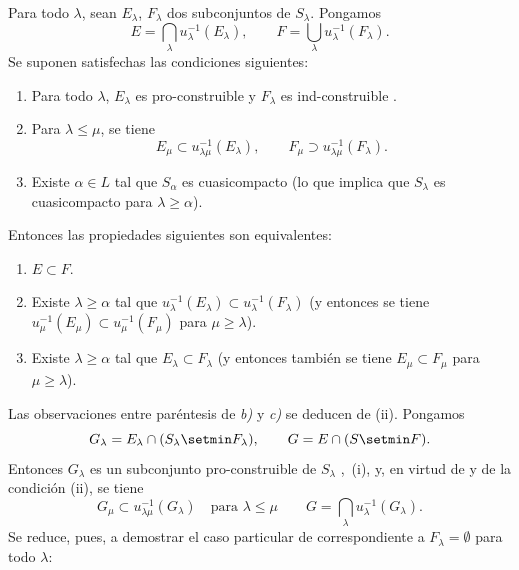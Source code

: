 \begin{theorem}[8.3.2]
\label{IV.8.3.2-fr}
Para todo $\lambda$, sean $E_\lambda$, $F_\lambda$ dos subconjuntos de $S_\lambda$.
Pongamos
\begin{equation}
E=\bigcap_\lambda u_\lambda^{-1}(E_\lambda),\qquad
F=\bigcup_\lambda u_\lambda^{-1}(F_\lambda).
\tag{8.3.2.1}\label{IV.8.3.2.1-fr}
\end{equation}
Se suponen satisfechas las condiciones siguientes:
\begin{enumerate}[label=\textup{(\roman*)}]
   \item Para todo $\lambda$, $E_\lambda$ es pro-construible y $F_\lambda$ es ind-construible .
   \item Para $\lambda\leq\mu$, se tiene
  \[
E_\mu\subset u_{\lambda\mu}^{-1}(E_\lambda),\qquad
F_\mu\supset u_{\lambda\mu}^{-1}(F_\lambda).
\]
   \item Existe $\alpha\in L$ tal que $S_\alpha$ es cuasicompacto \textup{(lo que implica que $S_\lambda$ es cuasicompacto para $\lambda\geq\alpha$)}.
\end{enumerate}
Entonces las propiedades siguientes son equivalentes:
\begin{enumerate}[label=\emph{\alph*)}]
   \item $E\subset F$.
   \item Existe $\lambda\geq\alpha$ tal que $u_\lambda^{-1}(E_\lambda)\subset u_\lambda^{-1}(F_\lambda)$ \textup{(y entonces se tiene $u_\mu^{-1}(E_\mu)\subset u_\mu^{-1}(F_\mu)$ para $\mu\geq\lambda$)}.
   \item Existe $\lambda\geq\alpha$ tal que $E_\lambda\subset F_\lambda$ \textup{(y entonces también se tiene $E_\mu\subset F_\mu$ para $\mu\geq\lambda$)}.
\end{enumerate}
\end{theorem}

Las observaciones entre paréntesis de \emph{b)} y \emph{c)} se deducen de (ii).
Pongamos
\[
G_\lambda=E_\lambda\cap(S_\lambda\setmin F_\lambda),\qquad
G=E\cap(S\setmin F).
\]
Entonces $G_\lambda$ es un subconjunto pro-construible de $S_\lambda$ ,~(i), y, en virtud de  y de la condición (ii), se tiene
\[
G_\mu\subset u_{\lambda\mu}^{-1}(G_\lambda)
\quad\text{para }\lambda\leq\mu
\qquad
G=\bigcap_\lambda u_\lambda^{-1}(G_\lambda).
\]
Se reduce, pues, a demostrar el caso particular de  correspondiente a $F_\lambda=\emptyset$ para todo $\lambda$:


